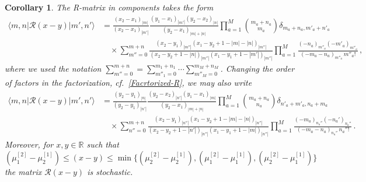 \documentclass[11pt]{article}
\numberwithin{equation}{section}
\newtheorem{corollary}[theorem]{Corollary}
\newcommand{\M}{M}
\newcommand{\eR}{\mathcal{R}}
\begin{document}
\begin{corollary}\label{Corollary-R-components-total}
		 			The R-matrix in components takes the form
		 			\begin{equation}\label{eq:fullR}
		 				\begin{split}
		 					\langle m,n|  {\eR}(x-y) |m',n'\rangle& =\frac{(x_2-x_1)_{|m|} }{(x_2-x_1)_{|m'|}}\frac{(y_1-x_1)_{|m'|}(y_2-x_2)_{|n|}}{(y_2-x_1)_{|m|+|n|}} \prod_{a=1}^{\M}\binom{m_a+n_a}{m_a} \delta_{m_a+n_a,m'_a+n'_a} \\
		 					&\quad\times\sum_{m''=0}^{m+n}
		 					\frac{\left(x_2-y_1\right)_{|m''|}\left(x_1-y_2+1-|m|-|n|\right)_{|m''|}}{\left(x_2-y_2+1-|n|\right)_{|m''|}\left(x_1-y_1+1-|m'|\right)_{|m''|}}
		 					\prod_{a=1}^{\M}\frac{\left({-n_{a}}\right)_{m''_{a}}\left(-m'_{a}\right)_{m''_{a}}}{\left(-m_{a}-n_{a}\right)_{m''_{a}}\,m''_{a}!}
		 					\,,
		 				\end{split}
		 			\end{equation}
		 			where we used the notation $\sum_{m''=0}^{m+n}=\sum_{m''_1=0}^{m_1+n_1}\cdots \sum_{m''_\M=0}^{m_\M+n_\M}$. {\color{black}Changing the order of factors in the factorization}, cf.~\eqref{Facrtorized-R}, we may also write
		 			\begin{equation}\label{eq:fullR1}
		 				\begin{split}
		 					\langle m,n|  {\eR}(x-y) |m',n'\rangle& =\frac{(y_2-y_1)_{|n|}}{(y_2-y_1)_{|{n'}|}} \frac{\left( y_2-x_2\right)_{|n'|} \left(y_1-x_1\right)_{|{m}|}}{\left(y_2-x_1\right)_{|m|+|n|}} \prod_{a=1}^{\M}\binom{m_a+n_a}{n_a} \delta_{n'_a+m'_a,n_a+m_a} \\
		 					&\quad\times\sum_{n''=0}^{m+n}\frac{\left(x_2-y_1\right)_{|n''|}\left(x_1-y_2+1-|m|-|n|\right)_{|n''|}}{\left( x_2-y_2+1-|n'|\right)_{|n''|}\left(x_1-y_1+1-|m|\right)_{|n''|}}  \prod_{a=1}^{\M} \frac{({-m_a})_{n_a''}(-n_a')_{n_a''}}{(-m_a-n_a)_{n_a''}\,n_a''!}
		 					\,.
		 				\end{split}
		 			\end{equation} 
                     Moreover,  for $x,y\in \mathbb{R}$ such that $(\mu_{1}^{[2]}-\mu_{2}^{[1]})\leq (x-y)\leq \min\{(\mu_{2}^{[2]}-\mu_{2}^{[1]}),(\mu_{1}^{[2]}-\mu_{1}^{[1]}),(\mu_{2}^{[2]}-\mu_{1}^{[1]})\}$ the matrix $\eR(x-y)$ is stochastic.  
                     		 		\end{corollary}
                
\end{document}
